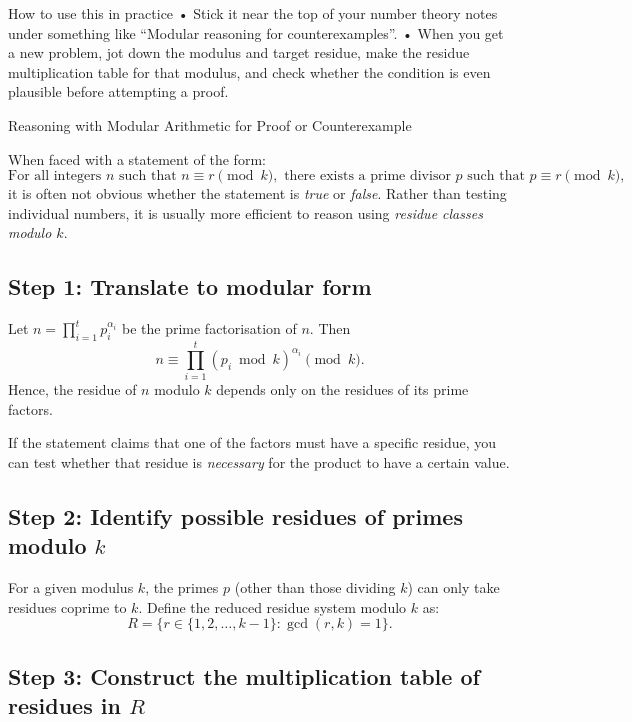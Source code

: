 \documentclass{tufte-handout}
\begin{document}
How to use this in practice
	•	Stick it near the top of your number theory notes under something like 
    “Modular reasoning for counterexamples”.
	•	When you get a new problem, jot down the modulus and target residue, make 
    the residue multiplication table for that modulus, and check whether the 
    condition is even plausible before attempting a proof.

\begin{section}{Reasoning with Modular Arithmetic for Proof or Counterexample}

When faced with a statement of the form:
\[
\text{For all integers } n \text{ such that } n \equiv r \pmod{k}, 
\text{ there exists a prime divisor } p \text{ such that } p \equiv r \pmod{k},
\]
it is often not obvious whether the statement is \emph{true} or \emph{false}.  
Rather than testing individual numbers, it is usually more efficient to reason using 
\emph{residue classes modulo \(k\)}.

\subsection*{Step 1: Translate to modular form}

Let \( n = \prod_{i=1}^t p_i^{\alpha_i} \) be the prime factorisation of \( n \).
Then
\[
n \equiv \prod_{i=1}^t (p_i \bmod k)^{\alpha_i} \pmod{k}.
\]
Hence, the residue of \(n\) modulo \(k\) depends only on the residues of its prime factors.

If the statement claims that one of the factors must have a specific residue,
you can test whether that residue is \emph{necessary} for the product to have a certain value.

\subsection*{Step 2: Identify possible residues of primes modulo \(k\)}

For a given modulus \(k\), the primes \(p\) (other than those dividing \(k\)) 
can only take residues coprime to \(k\).  
Define the reduced residue system modulo \(k\) as:
\[
R = \{ r \in \{1, 2, \ldots, k-1\} : \gcd(r, k) = 1 \}.
\]


\subsection*{Step 3: Construct the multiplication table of residues in \(R\)}


\end{section}
\end{document}
